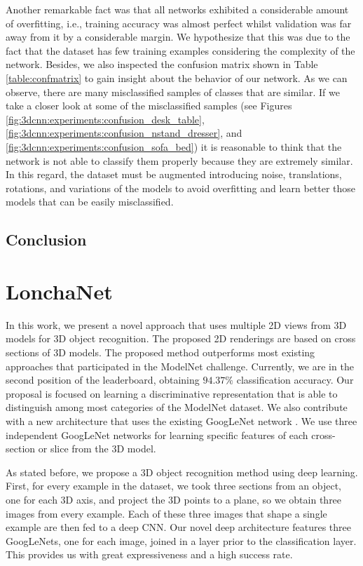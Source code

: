 Another remarkable fact was that all networks exhibited a considerable amount of overfitting, i.e., training accuracy was almost perfect whilst validation was far away from it by a considerable margin. We hypothesize that this was due to the fact that the dataset has few training examples considering the complexity of the network. Besides, we also inspected the confusion matrix shown in Table \ref{table:confmatrix} to gain insight about the behavior of our network. As we can observe, there are many misclassified samples of classes that are similar. If we take a closer look at some of the misclassified samples (see Figures \ref{fig:3dcnn:experiments:confusion_desk_table}, \ref{fig:3dcnn:experiments:confusion_nstand_dresser}, and \ref{fig:3dcnn:experiments:confusion_sofa_bed}) it is reasonable to think that the network is not able to classify them properly because they are extremely similar. In this regard, the dataset must be augmented introducing noise, translations, rotations, and variations of the models to avoid overfitting and learn better those models that can be easily misclassified.

\subsection{Conclusion}
\label{cha:objrecog:sec:study:subsec:conclusion}

\section{LonchaNet}
\label{cha:objrecog:sec:lonchanet}

In this work, we present a novel approach that uses multiple 2D views from 3D models for 3D object recognition. The proposed 2D renderings are based on cross sections of 3D models. The proposed method outperforms most existing approaches that participated in the ModelNet challenge. Currently, we are in the second position of the leaderboard, obtaining $94.37\%$ classification accuracy. Our proposal is focused on learning a discriminative representation that is able to distinguish among most categories of the ModelNet dataset. We also contribute with a new architecture that uses the existing GoogLeNet network \cite{Szegedy2015}. We use three independent GoogLeNet networks for learning specific features of each cross-section or slice from the 3D model.

As stated before, we propose a 3D object recognition method using deep learning. First, for every example in the dataset, we took three sections from an object, one for each 3D axis, and project the 3D points to a plane, so we obtain three images from every example.  Each of these three images that shape a single example are then fed to a deep \acl{CNN}. Our novel deep architecture features three GoogLeNets, one for each image, joined in a layer prior to the classification layer. This provides us with great expressiveness and a high success rate.

